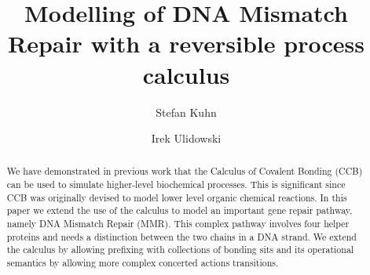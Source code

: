 \documentclass[review]{elsarticle}
\begin{document}
\begin{frontmatter}

\title{Modelling of DNA Mismatch Repair with a reversible process calculus}

\author{Stefan Kuhn}%
\address{School of Computer Science and Informatics, De Montfort University, Leicester, UK}

\author{Irek Ulidowski}%
\address{School of Informatics, University of Leicester, Leicester, UK}


%

\begin{abstract}
%
%
We have demonstrated in previous work that the Calculus of Covalent Bonding (CCB) can be used to simulate higher-level biochemical processes. This is significant since CCB was originally devised to model lower level organic chemical reactions. In this paper we extend the use of the calculus  to model an important gene repair pathway, namely DNA Mismatch Repair (MMR). This complex pathway involves four helper proteins and needs a distinction between the two chains in a DNA strand. 
We extend the calculus by allowing prefixing with collections of bonding sits and its operational semantics by allowing more complex concerted actions transitions.
\end{abstract}


\end{frontmatter}
\end{document}
